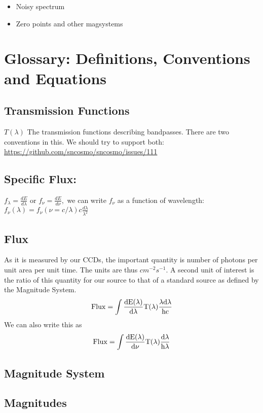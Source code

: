 \documentclass{article}[12pt]
\begin{document}
\begin{itemize}
    \item Noisy spectrum 
    \item Zero points and other magsystems 
\end{itemize}

\section{Glossary: Definitions, Conventions and Equations}

\subsection{Transmission Functions} $T(\lambda)$ The transmission functions describing bandpasses. There are two conventions in this. We should try to support both: \url{https://github.com/sncosmo/sncosmo/issues/111} 

\subsection{Specific Flux:} $f_{\lambda} = \frac{dE}{d\lambda}$ or 
$f_{\nu} = \frac{dE}{d\nu},$ we can write $f_\nu$ as a function of wavelength:
$f_\nu(\lambda) = f_{\nu}(\nu=c/\lambda) c \frac{d\lambda}{\lambda^2}$

\subsection{Flux} As it is measured by our CCDs, the important quantity is 
number of photons per unit area per unit time. The units are thus
$cm^{-2} s^{-1}$. A second unit of interest is the ratio of this quantity for our source to that of a standard source as defined by the Magnitude System.
\begin{equation}
\rm{Flux} = \int \frac{dE(\lambda)}{d\lambda} T(\lambda)
    \frac{\lambda d\lambda}{hc}
    \label{eqn:FluxFromflambda}
\end{equation}
We can also write this as 
\begin{equation}
    \rm{Flux} = \int \frac{dE(\lambda)}{d\nu} T(\lambda) \frac{d\lambda}{h\lambda}
    \label{eqn:FluxFromfnu}
\end{equation}
\subsection{Magnitude System}

\subsection{Magnitudes}
\end{document}
